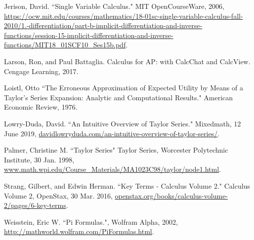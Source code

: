 \documentclass[12pt, titlepage]{article}
\begin{document}
\newpage
\begin{thebibliography}{thewidest}
  Jerison, David. ``Single Variable Calculus." MIT OpenCourseWare, 2006, \url{https://ocw.mit.edu/courses/mathematics/18-01sc-single-variable-calculus-fall-2010/1.-differentiation/part-b-implicit-differentiation-and-inverse-functions/session-15-implicit-differentiation-and-inverse-functions/MIT18_01SCF10_Ses15b.pdf}.

  Larson, Ron, and Paul Battaglia. Calculus for AP: with CalcChat and CalcView. Cengage Learning, 2017.

  Loistl, Otto ``The Erroneous Approximation of Expected Utility by Means of a Taylor's Series Expansion: Analytic and Computational Results." American Economic Review, 1976.

  Lowry-Duda, David. ``An Intuitive Overview of Taylor Series." Mixedmath, 12 June 2019, \url{davidlowryduda.com/an-intuitive-overview-of-taylor-series/}.

  Palmer, Christine M. ``Taylor Series" Taylor Series, Worcester Polytechnic Institute, 30 Jan. 1998, \url{www.math.wpi.edu/Course_Materials/MA1023C98/taylor/node1.html}.

  Strang, Gilbert, and Edwin Herman. ``Key Terms - Calculus Volume 2." Calculus Volume 2, OpenStax, 30 Mar. 2016, \url{openstax.org/books/calculus-volume-2/pages/6-key-terms}.

  Weisstein, Eric W. ``Pi Formulas.", Wolfram Alpha, 2002, \url{http://mathworld.wolfram.com/PiFormulas.html}.
\end{thebibliography}
\end{document}
